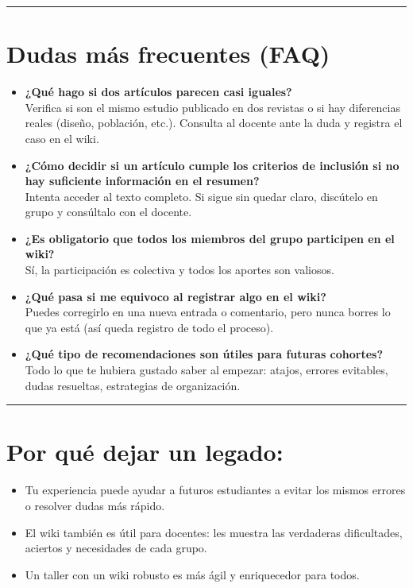 \documentclass[
  letterpaper,
]{book}
\providecommand{\tightlist}{%
  \setlength{\itemsep}{0pt}\setlength{\parskip}{0pt}}\usepackage{longtable,booktabs,array}
\begin{document}
\begin{center}\rule{0.5\linewidth}{0.5pt}\end{center}

\section{Dudas más frecuentes (FAQ)}\label{dudas-muxe1s-frecuentes-faq}

\begin{itemize}
\item
  \textbf{¿Qué hago si dos artículos parecen casi iguales?}\\
  Verifica si son el mismo estudio publicado en dos revistas o si hay
  diferencias reales (diseño, población, etc.). Consulta al docente ante
  la duda y registra el caso en el wiki.
\item
  \textbf{¿Cómo decidir si un artículo cumple los criterios de inclusión
  si no hay suficiente información en el resumen?}\\
  Intenta acceder al texto completo. Si sigue sin quedar claro,
  discútelo en grupo y consúltalo con el docente.
\item
  \textbf{¿Es obligatorio que todos los miembros del grupo participen en
  el wiki?}\\
  Sí, la participación es colectiva y todos los aportes son valiosos.
\item
  \textbf{¿Qué pasa si me equivoco al registrar algo en el wiki?}\\
  Puedes corregirlo en una nueva entrada o comentario, pero nunca borres
  lo que ya está (así queda registro de todo el proceso).
\item
  \textbf{¿Qué tipo de recomendaciones son útiles para futuras
  cohortes?}\\
  Todo lo que te hubiera gustado saber al empezar: atajos, errores
  evitables, dudas resueltas, estrategias de organización.
\end{itemize}

\begin{center}\rule{0.5\linewidth}{0.5pt}\end{center}

\section{Por qué dejar un legado:}\label{por-quuxe9-dejar-un-legado}

\begin{itemize}
\tightlist
\item
  Tu experiencia puede ayudar a futuros estudiantes a evitar los mismos
  errores o resolver dudas más rápido.
\item
  El wiki también es útil para docentes: les muestra las verdaderas
  dificultades, aciertos y necesidades de cada grupo.
\item
  Un taller con un wiki robusto es más ágil y enriquecedor para todos.
\end{itemize}
\end{document}
